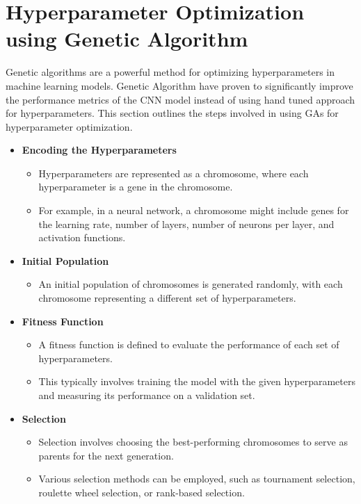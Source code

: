 \section{Hyperparameter Optimization using Genetic Algorithm}
Genetic algorithms are a powerful method for optimizing hyperparameters
in machine learning models. Genetic Algorithm have proven to significantly
improve the performance metrics of the CNN model instead of using hand tuned
approach for hyperparameters. This section outlines the steps involved in using
GAs for hyperparameter optimization\cite{9058307}.
\begin{itemize}
      \item \textbf{Encoding the Hyperparameters}
            \begin{itemize}
                  \item Hyperparameters are represented as a chromosome, where each hyperparameter is a
                        gene in the chromosome.
                  \item For example, in a neural network, a chromosome might include genes for the
                        learning rate, number of layers, number of neurons per layer, and activation
                        functions.
            \end{itemize}

      \item \textbf{Initial Population}
            \begin{itemize}
                  \item An initial population of chromosomes is generated randomly, with each
                        chromosome representing a different set of hyperparameters.
            \end{itemize}

      \item \textbf{Fitness Function}
            \begin{itemize}
                  \item A fitness function is defined to evaluate the performance of each set of
                        hyperparameters.
                  \item This typically involves training the model with the given hyperparameters and
                        measuring its performance on a validation set.
            \end{itemize}

      \item \textbf{Selection}
            \begin{itemize}
                  \item Selection involves choosing the best-performing chromosomes to serve as parents
                        for the next generation.
                  \item Various selection methods can be employed, such as tournament selection,
                        roulette wheel selection, or rank-based selection.
            \end{itemize}
            

\end{itemize}
